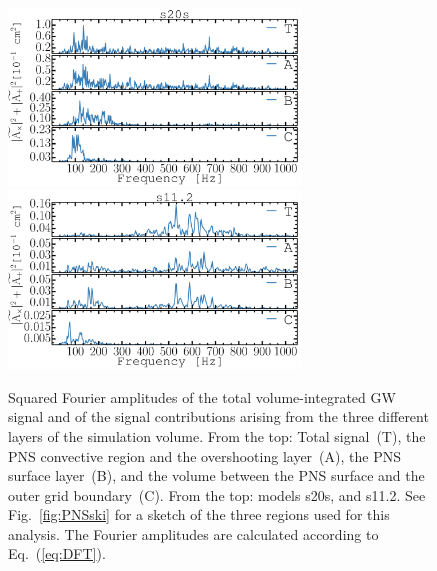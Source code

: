 \begin{figure}
\centering
\includegraphics[width=0.69\textwidth]{./images/paper1/fig6d.pdf} 
\includegraphics[width=0.69\textwidth]{./images/paper1/fig6c.pdf} \\
\caption{Squared Fourier amplitudes of the total volume-integrated GW
  signal and of the signal contributions arising from the three different
  layers of the simulation volume.  
  From the top: Total signal~(T), 
  the PNS convective region and the overshooting layer~(A), the PNS surface layer~(B),
  and the volume between the PNS surface and the outer grid boundary~(C).  
  From the top: models s20s, and s11.2.
  See Fig.~\ref{fig:PNSski} for a sketch of the three
  regions used for this analysis. The Fourier amplitudes are calculated according to
  Eq.~(\ref{eq:DFT}). 
\label{fig:cuts2}}
\end{figure}


